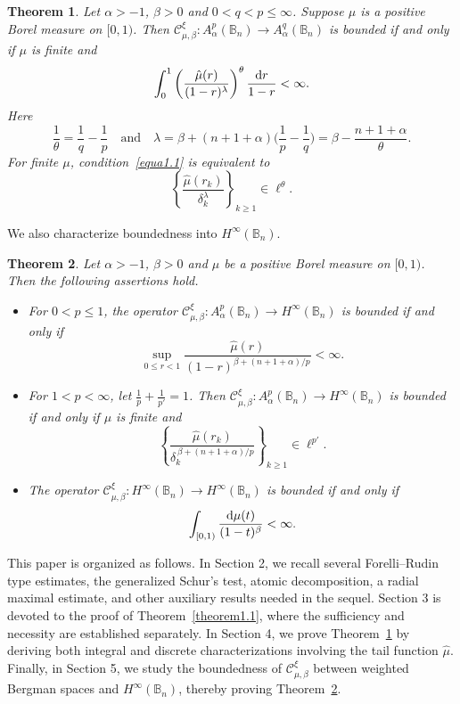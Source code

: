 \documentclass[preprint,12pt,times]{elsarticle}
\newtheorem{theorem}{Theorem}[section]
\theoremstyle{definition}
\theoremstyle{remark}
\numberwithin{equation}{section}
\begin{document}
\begin{theorem}\label{theorem1.2}
Let $\alpha>-1$, $\beta>0$ and   $0<q<p\leq\infty$. Suppose $\mu$ is a positive Borel measure on $[0,1)$.
Then $\mathcal{C}_{\mu,\beta}^{\xi}: A_{\alpha}^p(\mathbb{B}_n)\to A_{\alpha}^q(\mathbb{B}_n)$ is bounded if and only if $\mu$ is finite and 
\begin{equation}\label{equa1.1}
    \int_{0}^1\left(\frac{\hat{\mu}(r)}{(1-r)^{\lambda}}\right)^{\theta}\frac{{\rm d}r}{1-r}<\infty.
\end{equation}
Here
  \[
    \frac{1}{\theta}=\frac{1}q-\frac{1}p
    \quad \text{and}\quad
    \lambda=\beta+(n+1+\alpha)\Big(\frac{1}{p}-\frac{1}{q}\Big)
    =\beta-\frac{n+1+\alpha}{\theta}.
\]
For finite $\mu$, condition~\eqref{equa1.1} is equivalent to
\[
    \left\{\frac{\hat\mu(r_k)}{\delta_k^\lambda}\right\}_{k\geq1}
    \in\ell^\theta.
\]
 
\end{theorem}

We also characterize   boundedness into  $H^{\infty}(\mathbb{B}_n)$.

\begin{theorem}\label{theorem1.3}
Let $\alpha>-1$, $\beta>0$ and $\mu$ be a positive Borel measure on $[0,1)$. 
Then the following assertions hold.
\begin{itemize}
\item[(i)]   For $0<p\leq1$, the operator $\mathcal{C}_{\mu,\beta}^{\xi}: A_{\alpha}^p(\mathbb{B}_n)\to H^{\infty}(\mathbb{B}_n)$  is bounded if and only if
  \[
    \sup_{0\leq r<1}
    \frac{\hat\mu(r)}{(1-r)^{\beta+(n+1+\alpha)/p}}<\infty.
\] 
\item[(ii)] For   $1<p<\infty$, let $\frac{1}{p}+\frac{1}{p'}=1$.  Then $\mathcal{C}_{\mu,\beta}^{\xi}: A_{\alpha}^p(\mathbb{B}_n)\to H^{\infty}(\mathbb{B}_n)$ is bounded if and only if $\mu$ is finite and
\[
    \left\{\frac{\hat{\mu}(r_k)}{\delta_k^{\,\beta+(n+1+\alpha)/p}}\right\}_{k\geq 1}\in \ell^{p'}.
\]
\item[(iii)]   The operator $\mathcal{C}_{\mu,\beta}^{\xi}: H^{\infty}(\mathbb{B}_n)\to H^{\infty}(\mathbb{B}_n)$  is bounded if and only if
  \[
    \int_{[0,1)}\frac{{\rm d}\mu(t)}{(1-t)^{\beta}}<\infty.
\] 
\end{itemize}
\end{theorem}

This paper is organized as follows.
In Section 2, we recall several Forelli--Rudin type estimates, the generalized Schur's test,  atomic decomposition, a radial maximal estimate,  and other auxiliary results needed in the sequel.
Section 3 is devoted to the proof of Theorem~\ref{theorem1.1}, where the sufficiency and necessity are established separately.
In Section 4, we prove Theorem~\ref{theorem1.2} by deriving both integral and discrete characterizations involving the tail function $\hat{\mu}$.
Finally, in Section 5, we study the boundedness of $\mathcal{C}_{\mu,\beta}^{\xi}$ between weighted Bergman spaces and $H^{\infty}(\mathbb{B}_n)$, thereby proving Theorem~\ref{theorem1.3}.
\end{document}
